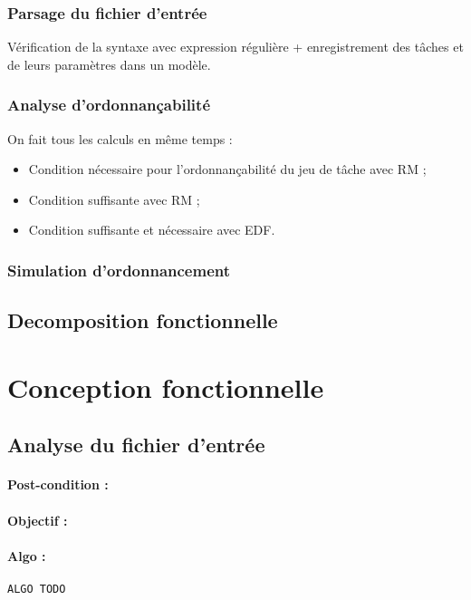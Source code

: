 			\subsubsection{Parsage du fichier d'entrée}
				Vérification de la syntaxe avec expression régulière + enregistrement des tâches et de leurs paramètres dans un modèle.
			
			\subsubsection{Analyse d'ordonnançabilité}
				On fait tous les calculs en même temps :
				\begin{itemize}
					\item Condition nécessaire pour l'ordonnançabilité du jeu de tâche avec RM ;
					\item Condition suffisante avec RM ;
					\item Condition suffisante et nécessaire avec EDF.
				\end{itemize}
			
			\subsubsection{Simulation d'ordonnancement}
			
		\subsection{Decomposition fonctionnelle}

	\section{Conception fonctionnelle}
	
		\subsection{Analyse du fichier d'entrée}
				\paragraph{Post-condition :} 
				\paragraph{Objectif :} 
				\paragraph{Algo :} 
					\begin{verbatim}
ALGO TODO
					\end{verbatim}
		

